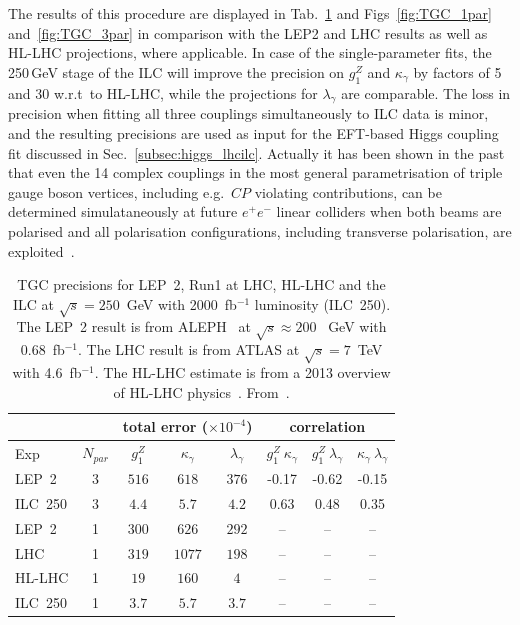 The results of this procedure are displayed in Tab.~\ref{table:ew_tgc} and Figs~\ref{fig:TGC_1par} and~\ref{fig:TGC_3par} in comparison with the LEP2 and LHC results as well as HL-LHC projections, where applicable. In case of the single-parameter fits, the 250\,GeV stage of the ILC will improve the precision on $ g^Z_1$ and $\kappa_\gamma$ by factors of 5 and 30 w.r.t\ to HL-LHC, while the projections for $\lambda_\gamma$ are comparable. The loss in precision when fitting all three couplings simultaneously to ILC data is minor, and the resulting precisions are used as input for the EFT-based Higgs coupling fit discussed in Sec.~\ref{subsec:higgs_lhcilc}. Actually it has been shown in the past that even the 14 complex couplings in the most general parametrisation of triple gauge boson vertices, including e.g.\ $CP$ violating contributions, can be determined simulataneously at future $e^+e^-$ linear colliders when both beams are polarised and all polarisation configurations, including transverse polarisation, are exploited~\cite{Diehl:2002nj}.

\begin{table}
\begin{center}
  \begin{tabular} {|l|c||c|c|c||c|c|c||}
    \hline
 &   &  \multicolumn{3}{|c||}{total error ($\times 10^{-4}$) } & \multicolumn{3}{c||}{correlation} \\
    \hline
    Exp & $N_{par}$ & $ g^Z_1$  & $\kappa_\gamma$ & $\lambda_\gamma$ & $g^Z_1\ \kappa_\gamma$ &  $g^Z_1\ \lambda_\gamma$  & $\kappa_\gamma\ \lambda_\gamma$  \\
    \hline
    LEP~2     & 3     &  $516$  & $618$  & $376$  & -0.17 & -0.62 & -0.15 \\
    ILC~250   & 3        & $4.4$ & $5.7$ & $4.2$ & 0.63 & 0.48 & 0.35 \\
    \hline
    LEP~2     & 1     & $300$ & $626$ & $292$ & -- & -- & -- \\
    LHC      & 1     & $319$ & $1077$ & $198$ & -- & -- & -- \\
    HL-LHC   & 1      & $19$ & $160$ & $4$ & -- & -- & -- \\
    ILC~250   & 1       & $3.7$ & $5.7$ & $3.7$ & -- & -- & -- \\
    \hline

\end{tabular}
  \caption{TGC precisions for LEP~2, Run1 at LHC, HL-LHC and the ILC at $\sqrt{s}=250$~GeV with 2000~fb$^{-1}$ luminosity (ILC~250). The LEP~2 result is from ALEPH~\cite{Schael:2004tq} at  $\sqrt{s}\approx 200$~ GeV with
    0.68~fb$^{-1}$.  The LHC result is from ATLAS\cite{Aad:2014mda} at $\sqrt{s}=7$~TeV with 4.6~fb$^{-1}$.  The HL-LHC estimate is from a 2013 overview of HL-LHC physics~\cite{bib:HLLHCMoenig}. From~\cite{Fujii:2017vwa}.}
\label{table:ew_tgc}
\end{center}
\end{table}

